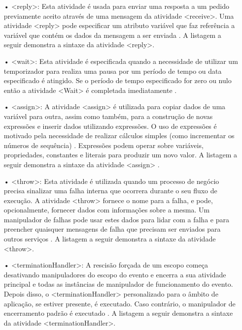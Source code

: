 \begin{itemize}


\item[•] <reply>: Esta atividade é usada para enviar uma resposta a um pedido previamente aceito através de uma mensagem da atividade <receive>. Uma atividade <reply> pode especificar um atributo variável que faz referência a variável que contém os dados da mensagem a ser enviada \cite{BPEL20} . A listagem a seguir demonstra a sintaxe da atividade <reply>.

%

\item[•] <wait>: Esta atividade é especificada quando a necessidade de utilizar um temporizador para realiza uma pausa por um período de tempo ou data especificado é atingido. Se o período de tempo especificado for zero ou nulo então a atividade <Wait> é completada imediatamente \cite{BPEL20}.

%

\item[•] <assign>: A atividade <assign> é utilizada para copiar dados de uma variável para outra, assim como também, para a construção de novas expressões e inserir dados utilizando expressões. O uso de expressões é motivado pela necessidade de realizar cálculos simples (como incrementar os números de sequência) \cite{BPEL20}. Expressões podem operar sobre variáveis, propriedades, constantes e literais para produzir um novo valor. A listagem a seguir demonstra a sintaxe da atividade <assign> .

%

\item[•] <throw>: Esta atividade é utilizada quando um processo de negócio precisa sinalizar uma falha interna que ocorrera durante o seu fluxo de execução. A atividade <throw> fornece o nome para a falha, e pode, opcionalmente, fornecer dados com informações sobre a mesma. Um manipulador de falhas pode usar estes dados para lidar com a falha e para preencher quaisquer mensagens de falha que precisam ser enviados para outros serviços \cite{BPEL20}. A listagem a seguir demonstra a sintaxe da atividade <throw>.

%

\item[•] <terminationHandler>:  A rescisão forçada de um escopo começa desativando manipuladores do escopo do evento e encerra a sua atividade principal e todas as instâncias de manipulador de funcionamento do evento. Depois disso, o <terminationHandler> personalizado para o âmbito de aplicação, se estiver presente, é executado. Caso contrário, o manipulador de encerramento padrão é executado \cite{BPEL20}. A listagem a seguir demonstra a sintaxe da atividade <terminationHandler>.


\end{itemize}
